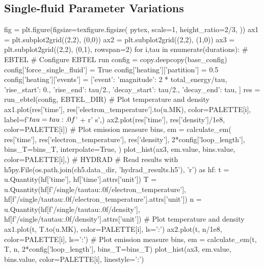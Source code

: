 \subsection{Single-fluid Parameter Variations}\label{hot-plasma:subsec:sf_par_var}

\begin{pycode}[chapter5]
fig = plt.figure(figsize=texfigure.figsize(
    pytex,
    scale=1,
    height_ratio=2/3,
))
ax1 = plt.subplot2grid((2,2), (0,0))
ax2 = plt.subplot2grid((2,2), (1,0))
ax3 = plt.subplot2grid((2,2), (0,1), rowspan=2)
for i,tau in enumerate(durations):
    # EBTEL
    # Configure EBTEL run
    config = copy.deepcopy(base_config)
    config['force_single_fluid'] = True
    config['heating']['partition'] = 0.5
    config['heating']['events'] = [{'event': {
        'magnitude': 2 * total_energy/tau,
        'rise_start': 0.,
        'rise_end': tau/2.,
        'decay_start': tau/2.,
        'decay_end': tau,
    }}]
    res = run_ebtel(config, EBTEL_DIR)
    # Plot temperature and density
    ax1.plot(res['time'], res['electron_temperature'].to(u.MK), color=PALETTE[i],
             label=f'$\\tau={tau:.0f}$' + r' \si{\second}',)
    ax2.plot(res['time'], res['density']/1e8, color=PALETTE[i])
    # Plot emission measure
    bins, em = calculate_em(
        res['time'],
        res['electron_temperature'],
        res['density'],
        2*config['loop_length'],
        bins_T=bins_T,
        interpolate=True,
    )
    plot_hist(ax3, em.value, bins.value, color=PALETTE[i],)
    # HYDRAD
    # Read results
    with h5py.File(os.path.join(ch5.data_dir, 'hydrad_results.h5'), 'r') as hf:
        t = u.Quantity(hf['time'], hf['time'].attrs['unit'])
        T = u.Quantity(hf[f'/single/tau{tau:.0f}/electron_temperature'],
                       hf[f'/single/tau{tau:.0f}/electron_temperature'].attrs['unit'])
        n = u.Quantity(hf[f'/single/tau{tau:.0f}/density'],
                       hf[f'/single/tau{tau:.0f}/density'].attrs['unit'])
    # Plot temperature and density
    ax1.plot(t, T.to(u.MK), color=PALETTE[i], ls=':')
    ax2.plot(t, n/1e8, color=PALETTE[i], ls=':')
    # Plot emission measure
    bins, em = calculate_em(t, T, n, 2*config['loop_length'], bins_T=bins_T)
    plot_hist(ax3, em.value, bins.value, color=PALETTE[i], linestyle=':')
    

\end{pycode}
